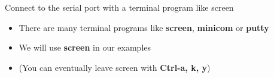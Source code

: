 \begin{frame}
   {Connect to the serial port with a terminal program like screen}
   \begin{itemize}
      \item There are many terminal programs like \textbf{screen},
		   \textbf{minicom} or \textbf{putty}
      \item We will use \textbf{screen} in our examples
      \item (You can eventually leave screen with \textbf{Ctrl-a, k, y})
   \end{itemize}
\end{frame}

\cprotect\note{


}

